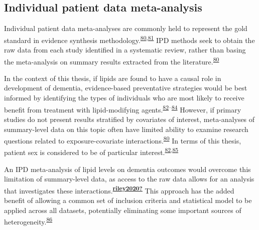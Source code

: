 \documentclass[a4paper, twoside]{templates/ociamthesis}
\begin{document}
\hypertarget{individual-patient-data-meta-analysis}{%
\subsection{Individual patient data meta-analysis}\label{individual-patient-data-meta-analysis}}

Individual patient data meta-analyses are commonly held to represent the gold standard in evidence synthesis methodology.\textsuperscript{\protect\hyperlink{ref-riley2010}{80},\protect\hyperlink{ref-stewart1993}{81}} IPD methods seek to obtain the raw data from each study identified in a systematic review, rather than basing the meta-analysis on summary results extracted from the literature.\textsuperscript{\protect\hyperlink{ref-riley2010}{80}}

In the context of this thesis, if lipids are found to have a causal role in development of dementia, evidence-based preventative strategies would be best informed by identifying the types of individuals who are most likely to receive benefit from treatment with lipid-modifying agents.\textsuperscript{\protect\hyperlink{ref-arain2009}{82}--\protect\hyperlink{ref-mccartney2016}{84}} However, if primary studies do not present results stratified by covariates of interest, meta-analyses of summary-level data on this topic often have limited ability to examine research questions related to exposure-covariate interactions.\textsuperscript{\protect\hyperlink{ref-riley2010}{80}} In terms of this thesis, patient sex is considered to be of particular interest.\textsuperscript{\protect\hyperlink{ref-arain2009}{82},\protect\hyperlink{ref-letenneur1999}{85}}

An IPD meta-analysis of lipid levels on dementia outcomes would overcome this limitation of summary-level data, as access to the raw data allows for an analysis that investigates these interactions.\textsuperscript{\protect\hyperlink{ref-riley2020}{\textbf{riley2020?}}} This approach has the added benefit of allowing a common set of inclusion criteria and statistical model to be applied across all datasets, potentially eliminating some important sources of heterogeneity.\textsuperscript{\protect\hyperlink{ref-stewart2002}{86}}
\end{document}
